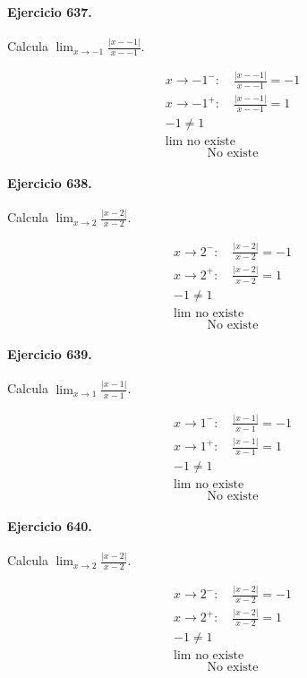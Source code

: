 \documentclass[11pt,a4paper]{article}
\begin{document}
\paragraph{Ejercicio 637.} Calcula $\displaystyle\lim_{x\to -1}\frac{|x--1|}{x--1}$. 

\[
\begin{aligned}
x\to -1^-:\quad \frac{|x--1|}{x--1}=-1\\
x\to -1^+:\quad \frac{|x--1|}{x--1}=1\\
-1\ne1\\
\lim\text{{ no existe}}
\end{aligned}
\]
\[\boxed{\text{{No existe}}}\]


\paragraph{Ejercicio 638.} Calcula $\displaystyle\lim_{x\to 2}\frac{|x-2|}{x-2}$. 

\[
\begin{aligned}
x\to 2^-:\quad \frac{|x-2|}{x-2}=-1\\
x\to 2^+:\quad \frac{|x-2|}{x-2}=1\\
-1\ne1\\
\lim\text{{ no existe}}
\end{aligned}
\]
\[\boxed{\text{{No existe}}}\]


\paragraph{Ejercicio 639.} Calcula $\displaystyle\lim_{x\to 1}\frac{|x-1|}{x-1}$. 

\[
\begin{aligned}
x\to 1^-:\quad \frac{|x-1|}{x-1}=-1\\
x\to 1^+:\quad \frac{|x-1|}{x-1}=1\\
-1\ne1\\
\lim\text{{ no existe}}
\end{aligned}
\]
\[\boxed{\text{{No existe}}}\]


\paragraph{Ejercicio 640.} Calcula $\displaystyle\lim_{x\to 2}\frac{|x-2|}{x-2}$. 

\[
\begin{aligned}
x\to 2^-:\quad \frac{|x-2|}{x-2}=-1\\
x\to 2^+:\quad \frac{|x-2|}{x-2}=1\\
-1\ne1\\
\lim\text{{ no existe}}
\end{aligned}
\]
\[\boxed{\text{{No existe}}}\]
\end{document}
